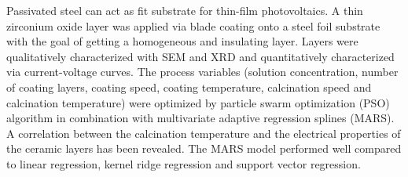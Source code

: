 Passivated steel can act as fit substrate for thin-film photovoltaics.
A thin zirconium oxide layer was applied via blade coating onto a steel foil substrate with the goal of getting a homogeneous and insulating layer.
Layers were qualitatively characterized with SEM and XRD and quantitatively characterized via current-voltage curves.
The process variables (solution concentration, number of coating layers, coating speed, coating temperature, calcination speed and calcination temperature) were optimized by particle swarm optimization (PSO) algorithm in combination with multivariate adaptive regression splines (MARS).
A correlation between the calcination temperature and the electrical properties of the ceramic layers has been revealed. 
The MARS model performed well compared to 
linear regression, kernel ridge regression and support vector regression.
